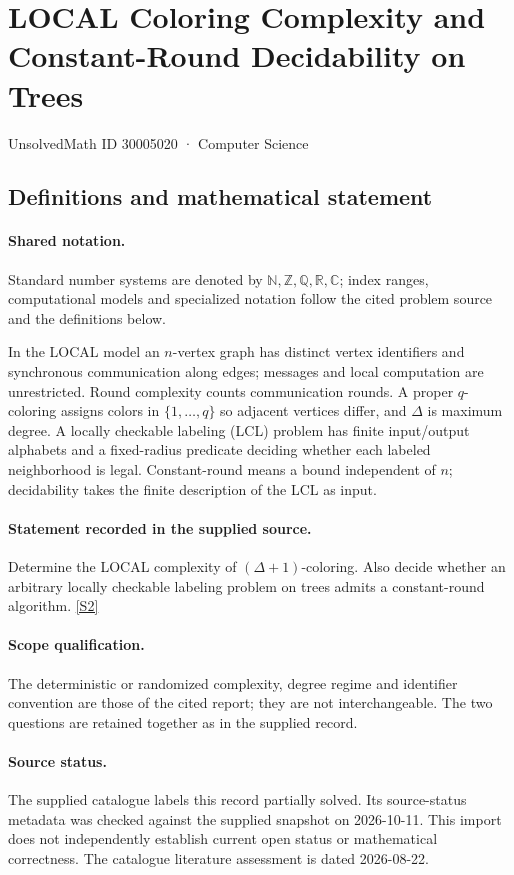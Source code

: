 \documentclass[11pt]{article}
\newcommand{\sref}[2]{\hyperlink{source:#1:#2}{[S#2]}}
\begin{document}
\setcounter{section}{30005019}
\section{LOCAL Coloring Complexity and Constant-Round Decidability on Trees}\label{30005020}
{\small\sffamily UnsolvedMath ID 30005020 · Computer Science}
\subsection{Definitions and mathematical statement}

\paragraph{Shared notation.}Standard number systems are denoted by $\mathbb N,\mathbb Z,\mathbb Q,\mathbb R,\mathbb C$; index ranges, computational models and specialized notation follow the cited problem source and the definitions below.


In the LOCAL model an $n$-vertex graph has distinct vertex identifiers and synchronous communication along edges; messages and local computation are unrestricted. Round complexity counts communication rounds. A proper $q$-coloring assigns colors in $\{1,\ldots,q\}$ so adjacent vertices differ, and $\Delta$ is maximum degree. A locally checkable labeling (LCL) problem has finite input/output alphabets and a fixed-radius predicate deciding whether each labeled neighborhood is legal. Constant-round means a bound independent of $n$; decidability takes the finite description of the LCL as input.
\paragraph{Statement recorded in the supplied source.}
Determine the LOCAL complexity of $(\Delta+1)$-coloring. Also decide whether an arbitrary locally checkable labeling problem on trees admits a constant-round algorithm. \sref{30005020}{2}
\paragraph{Scope qualification.}
The deterministic or randomized complexity, degree regime and identifier convention are those of the cited report; they are not interchangeable. The two questions are retained together as in the supplied record.
\paragraph{Source status.}
The supplied catalogue labels this record partially solved. Its source-status metadata was checked against the supplied snapshot on 2026-10-11. This import does not independently establish current open status or mathematical correctness. The catalogue literature assessment is dated 2026-08-22.
\end{document}
